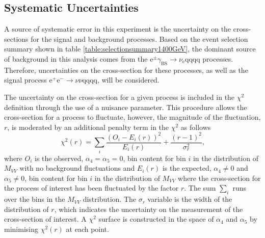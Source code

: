
\subsection{Systematic Uncertainties}
\label{sec:systematics}
A source of systematic error in this experiment is the uncertainty on the cross-sections for the signal and background processes.  Based on the event selection summary shown in table \ref{table:selectionsummary1400GeV}, the dominant source of background in this analysis comes from the $\text{e}^{\pm}\gamma_{\text{BS}} \rightarrow \nu_{\text{e}}\text{qqqq}$ processes.  Therefore, uncertainties on the cross-section for these processes, as well as the signal process $\text{e}^{+}\text{e}^{-} \rightarrow \nu{\nu}\text{qqqq}$, will be considered.  

The uncertainty on the cross-section for a given process is included in the $\chi^{2}$ definition through the use of a nuisance parameter.  This procedure allows the cross-section for a process to fluctuate, however, the magnitude of the fluctuation, $r$, is moderated by an additional penalty term in the $\chi^{2}$ as follows
%
\begin{equation}
\chi^{2}(r) = \sum_{i} \frac{(O_{i} - E_{i}(r))^{2}}{E_{i}(r)} + \frac{(r-1)^{2}}{\sigma_{r}^{2}} \text{,}
\end{equation}
%
\noindent where $O_{i}$ is the observed, $\alpha_{4} = \alpha_{5} = 0$, bin content for bin $i$ in the distribution of $M_{VV}$ with no background fluctuations and $E_{i}(r)$ is the expected, $\alpha_{4} \neq 0$ and $\alpha_{5} \neq 0$, bin content for bin $i$ in the distribution of $M_{VV}$ where the cross-section for the process of interest has been fluctuated by the factor $r$.  The sum $\sum_{i}$ runs over the bins in the $M_{VV}$ distribution.  The $\sigma_{r}$ variable is the width of the distribution of $r$, which indicates the uncertainty on the measurement of the cross-section of interest.  A $\chi^{2}$ surface is constructed in the space of $\alpha_{4}$ and $\alpha_{5}$ by minimising $\chi^{2}(r)$ at each point.  

